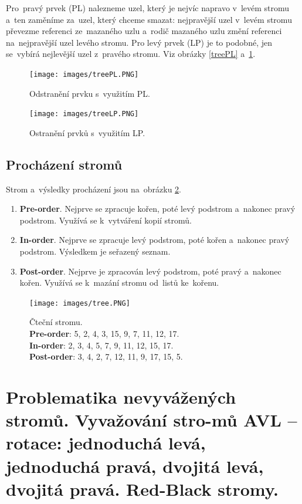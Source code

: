 Pro~pravý prvek (PL) nalezneme uzel, který je nejvíc napravo v~levém stromu a~ten zaměníme za~uzel, který chceme smazat: nejpravější uzel v~levém stromu převezme referenci ze~mazaného uzlu a~rodič mazaného uzlu změní referenci na~nejpravější uzel levého stromu. Pro levý prvek (LP) je to podobné, jen se~vybírá nejlevější uzel z~pravého stromu. Viz obrázky \ref{treePL} a~\ref{treeLP}.

\begin{figure}[ht]
	\centering
	\texttt{[image: images/treePL.PNG]}
	\caption{Odstranění prvku s~využitím PL.}
	\label{treePL}

	\texttt{[image: images/treeLP.PNG]}
	\caption{Ostranění prvků s~využitím LP.}
	\label{treeLP}
\end{figure}

\subsection{Procházení stromů}

Strom a~výsledky procházení jsou na~obrázku \ref{tree}.

\begin{enumerate}
\item \textbf{Pre-order}. Nejprve se zpracuje kořen, poté levý podstrom a~nakonec pravý podstrom. Využívá se k~vytváření kopií stromů.
\item \textbf{In-order}. Nejprve se zpracuje levý podstrom, poté kořen a~nakonec pravý podstrom. Výsledkem je seřazený seznam.
\item \textbf{Post-order}. Nejprve je zpracován levý podstrom, poté pravý a~nakonec kořen. Využívá se k~mazání stromu od~listů ke~kořenu.
\end{enumerate}

\begin{figure}[ht]
	\centering
	\texttt{[image: images/tree.PNG]}
	\caption{
		Čteční stromu. \\
		\textbf{Pre-order}: 5, 2, 4, 3, 15, 9, 7, 11, 12, 17. \\
		\textbf{In-order}: 2, 3, 4, 5, 7, 9, 11, 12, 15, 17. \\
		\textbf{Post-order}: 3, 4, 2, 7, 12, 11, 9, 17, 15, 5. \\
	}
	\label{tree}
\end{figure}

\clearpage
\section[Problematika nevyvážených stromů. Vyvažování stromů AVL - rotace: jednoduchá levá, jednoduchá pravá, dvojitá levá, dvojitá pravá. Red-Black stromy]{Problematika nevyvážených stromů. Vyvažování stro-mů AVL -- rotace: jednoduchá levá, jednoduchá pravá, dvojitá levá, dvojitá pravá. Red-Black stromy.
}

